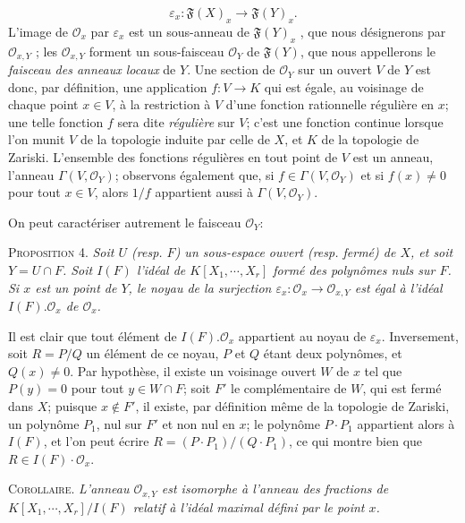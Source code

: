 \begin{equation*}
\varepsilon_x : \mathfrak{F}(X)_x \longrightarrow \mathfrak{F}(Y)_x .
\end{equation*}
L'image de $\mathcal{O}_x$ par $\varepsilon_x$ est un sous-anneau de $\mathfrak{F}(Y)_x$ , que nous désignerons par $\mathcal{O}_{x,Y}$ ; les $\mathcal{O}_{x,Y}$ forment un sous-faisceau $\mathcal{O}_Y$ de $\mathfrak{F}(Y)$, que nous appellerons le \textit{faisceau des anneaux locaux} de $Y$. Une section de $\mathcal{O}_Y$ sur un ouvert $V$ de $Y$ est donc, par définition, une application $f : V \to K$ qui est égale, au voisinage de chaque point $x \in V$, à la restriction à $V$ d'une fonction rationnelle régulière en $x$; une telle fonction $f$ sera dite \textit{régulière} sur $V$; c'est une fonction continue lorsque l'on munit $V$ de la topologie induite par celle de $X$, et $K$ de la topologie de Zariski. L'ensemble des fonctions régulières en tout point de $V$ est un anneau, l'anneau $\Gamma(V, \mathcal{O}_Y)$; observons également que, si $f \in \Gamma(V, \mathcal{O}_Y)$ et si $f(x) \neq 0$ pour tout $x \in V$, alors $1/f$ appartient aussi à $\Gamma(V, \mathcal{O}_Y)$.



On peut caractériser autrement le faisceau $\mathcal{O}_Y$:

\textsc{Proposition 4.} \textit{Soit $U$ (resp. $F$) un sous-espace ouvert (resp. fermé) de $X$, et soit $Y = U \cap F$. Soit $I(F)$ l'idéal de $K[X_1, \cdots, X_r]$ formé des polynômes nuls sur $F$. Si $x$ est un point de $Y$, le noyau de la surjection $\varepsilon_x\colon \mathcal{O}_x \longrightarrow \mathcal{O}_{x,Y}$ est égal à l'idéal $I(F).\mathcal{O}_x$ de $\mathcal{O}_x$.}

Il est clair que tout élément de $I(F).\mathcal{O}_x$ appartient au noyau de $\varepsilon_x$. Inversement, soit $R = P/Q$ un élément de ce noyau, $P$ et $Q$ étant deux polynômes, et $Q(x) \neq 0$. Par hypothèse, il existe un voisinage ouvert $W$ de $x$ tel que $P(y) = 0$ pour tout $y \in W \cap F$; soit $F'$ le complémentaire de $W$, qui est fermé dans $X$; puisque $x \notin F'$, il existe, par définition même de la topologie de Zariski, un polynôme $P_1$, nul sur $F'$ et non nul en $x$; le polynôme $P \cdot P_1$ appartient alors à $I(F)$, et l'on peut écrire $R = (P \cdot P_1)/(Q \cdot P_1)$, ce qui montre bien que $R \in I(F) \cdot \mathcal{O}_x$.

\textsc{Corollaire.} \textit{L'anneau $\mathcal{O}_{x,Y}$ est isomorphe à l'anneau des fractions de $K[X_1, \cdots, X_r]/I(F)$ relatif à l'idéal maximal défini par le point $x$.}

